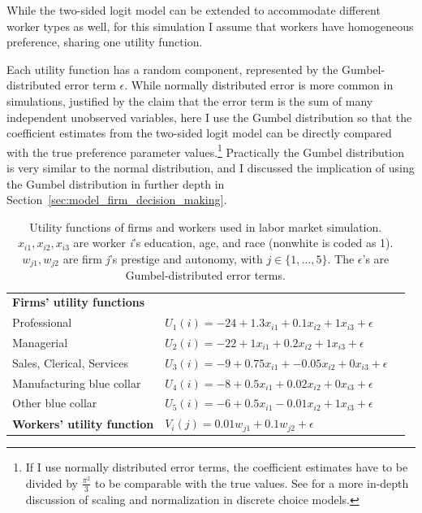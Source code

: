 While the two-sided logit model can be extended to accommodate different worker
types as well, for this simulation I assume that workers have homogeneous
preference, sharing one utility function.

Each utility function has a random component, represented by the
Gumbel-distributed error term $\epsilon$. While normally distributed error is
more common in simulations, justified by the claim that the error term is the
sum of many independent unobserved variables, here I use the Gumbel distribution
so that the coefficient estimates from the two-sided logit model can be directly
compared with the true preference parameter values.\footnote{If I use normally
  distributed error terms, the coefficient estimates have to be divided by
  $\frac{\pi^2}{3}$ to be comparable with the true values. See \citet[chap
  2]{Train2009} for a more in-depth discussion of scaling and normalization in
  discrete choice models.} Practically the Gumbel distribution is very similar
to the normal distribution, and I discussed the implication of using the Gumbel
distribution in further depth in Section~\ref{sec:model_firm_decision_making}.

\begin{table}[!ht]
  \centering
  \caption[Utility functions used in labor market simulations.]{Utility
    functions of firms and workers used in labor market simulation. $x_{i1},
    x_{i2}, x_{i3}$ are worker \textit{i}'s education, age, and race (nonwhite
    is coded as 1). $w_{j1}, w_{j2}$ are firm \textit{j}'s prestige and
    autonomy, with $j \in \{1, \dots, 5\}$. The $\epsilon$'s are
    Gumbel-distributed error terms.}
  \label{tab:sim_labor_nojobs_utility_functions}
  \begin{tabular}{lll}
    \\[-1.8ex]\hline
    \textbf{Firms' utility functions}  &                                                                                     \\
    Professional                         & $U_{1}(i) = -24 + 1.3 x_{i1} + 0.1 x_{i2} + 1 x_{i3} + \epsilon$         \\
    Managerial                           & $U_{2}(i) = -22 + 1 x_{i1} + 0.2 x_{i2} + 1 x_{i3} + \epsilon$     \\
    Sales, Clerical, Services            & $U_{3}(i) = -9 + 0.75 x_{i1} + -0.05 x_{i2} + 0 x_{i3} + \epsilon$ \\
    Manufacturing blue collar            & $U_{4}(i) = -8 + 0.5 x_{i1} + 0.02 x_{i2} + 0 x_{i3} + \epsilon$   \\
    Other blue collar                    & $U_{5}(i) = -6 + 0.5 x_{i1} - 0.01 x_{i2} + 1 x_{i3} + \epsilon$   \\
    \hline
    \textbf{Workers' utility function} & $V_{i}(j) = 0.01 w_{j1} + 0.1 w_{j2} + \epsilon$                   \\
    \hline
  \end{tabular}
\end{table}

